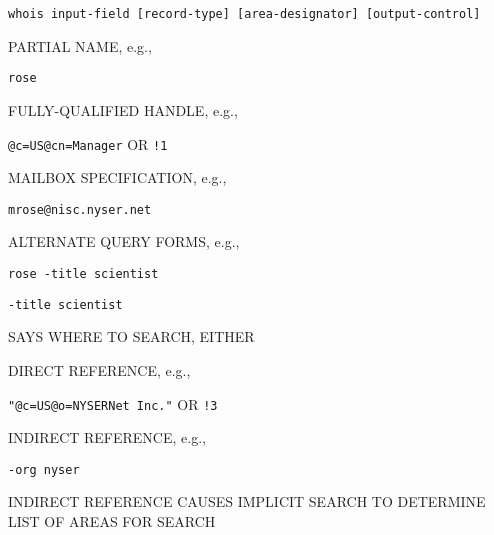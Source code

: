 \begin{bwslide}

{\small\begin{verbatim}
whois input-field [record-type] [area-designator] [output-control]
\end{verbatim}}

\begin{nrtc}
\item	PARTIAL NAME, e.g.,
    \begin{nrtc}
    \item	\verb"rose"
    \end{nrtc}

\item	FULLY-QUALIFIED HANDLE, e.g.,
    \begin{nrtc}
    \item	 \verb"@c=US@cn=Manager" OR \verb"!1"
    \end{nrtc}

\item	MAILBOX SPECIFICATION, e.g.,
    \begin{nrtc}
    \item	\verb"mrose@nisc.nyser.net"
    \end{nrtc}

\item	ALTERNATE QUERY FORMS, e.g.,
    \begin{nrtc}
    \item	\verb"rose -title scientist"

    \item	\verb"-title scientist"

    \end{nrtc}
\end{nrtc}
\end{bwslide}


\begin{bwslide}

\begin{nrtc}
\item	SAYS WHERE TO SEARCH, EITHER

\item	DIRECT REFERENCE, e.g.,
    \begin{nrtc}
    \item	\verb|"@c=US@o=NYSERNet Inc."| OR \verb"!3"
    \end{nrtc}

\item	INDIRECT REFERENCE, e.g.,
    \begin{nrtc}
    \item	\verb"-org nyser"
    \end{nrtc}

\item	INDIRECT REFERENCE CAUSES IMPLICIT SEARCH TO DETERMINE LIST OF AREAS
	FOR SEARCH
\end{nrtc}
\end{bwslide}


